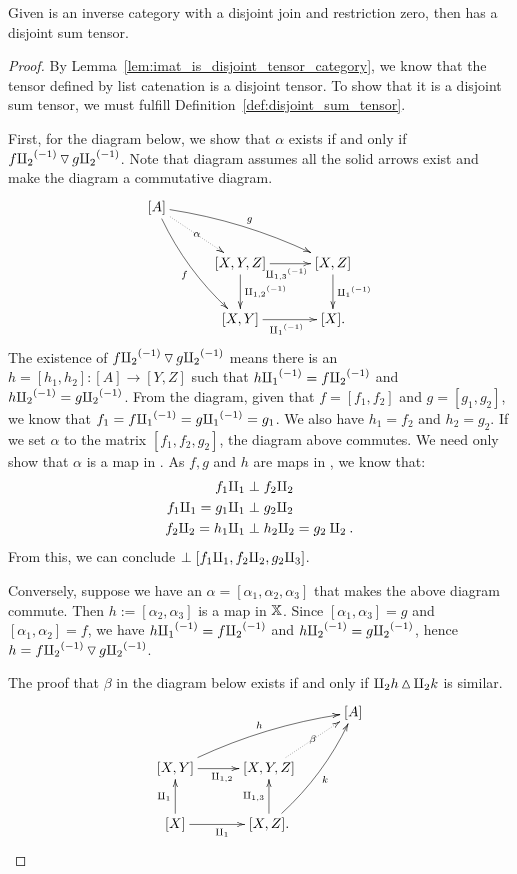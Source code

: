 \begin{lemma}\label{lem:imat_tensor_is_a_disjoint_sum_tensor}
  Given \X is an inverse category with a disjoint join and restriction zero, then \imatx
  has a disjoint sum tensor.
\end{lemma}
\begin{proof}
  By Lemma~\ref{lem:imat_is_disjoint_tensor_category}, we know that the tensor defined by
  list catenation is a disjoint tensor. To show that it is a disjoint sum tensor, we must
  fulfill Definition~\ref{def:disjoint_sum_tensor}.

  First, for the diagram below, we show that $\alpha$ exists if and only if
  $f{\amalg_{2}}^{(-1)} \operatorname{\triangledown} g{\amalg_{2}}^{(-1)}$. Note that diagram assumes all the solid arrows exist and make the
  diagram a commutative diagram.
  \begin{align*}
    \xymatrix@C+5pt{
      [A] \ar@/_/[ddr]_f \ar@/^/[drr]^g \ar@{.>}[dr]|-{\alpha} \\
        & [X,Y,Z] \ar[d]^{\icp{1,2}} \ar[r]_{\icp{1,3}} & [X,Z] \ar[d]^{\icpa} \\
        & [X,Y] \ar[r]_{\icpa} & [X].
    }
  \end{align*}
  The existence of $f{\amalg_{2}}^{(-1)} \operatorname{\triangledown} g{\amalg_{2}}^{(-1)}$ means there is an $h = [h_1,h_2]: [A]\to[Y,Z]$ such that
  $h{\amalg_{1}}^{(-1)} = f{\amalg_{2}}^{(-1)}$ and $h{\amalg_{2}}^{(-1)} = g{\amalg_{2}}^{(-1)}$. From the diagram, given that $f = [f_1,f_2]$ and
  $g = [g_1,g_2]$, we know that $f_1 = f{\amalg_{1}}^{(-1)} = g{\amalg_{1}}^{(-1)} = g_1$. We also have $h_1 = f_2$ and
  $h_2 = g_2$. If we set $\alpha$ to the matrix $[f_1,f_2,g_2]$, the diagram above commutes.
  We need only show that $\alpha$ is a map in \imatx. As $f, g$ and $h$ are maps in
  \imatx, we know that:
  \begin{align*}
    f_1\amalg_{1} & \perp f_2 \amalg_{2}\\
    f_1\amalg_{1} = g_1\amalg_{1} & \perp g_2 \amalg_{2}\\
    f_2 \amalg_{2} = h_1\amalg_{1} & \perp h_2 \amalg_{2} = g_2 \amalg_{2}.\\
  \end{align*}
  From this, we can conclude $\perp [f_1 \amalg_{1}, f_2 \amalg_{2}, g_2 \amalg_{3}]$.

  Conversely, suppose we have an $\alpha = [\alpha_1, \alpha_2, \alpha_3]$ that makes the
  above diagram commute. Then  $h := [\alpha_2, \alpha_3]$ is a map in $\mathbb{X}$.
  Since $[\alpha_1,\alpha_3] = g$ and $[\alpha_1,\alpha_2] = f$, we have
  $h{\amalg_{1}}^{(-1)} = f{\amalg_{2}}^{(-1)}$ and $h{\amalg_{2}}^{(-1)} = g{\amalg_{2}}^{(-1)}$, hence $h = f{\amalg_{2}}^{(-1)} \operatorname{\triangledown} g{\amalg_{2}}^{(-1)}$.

  The proof that $\beta$ in the diagram below exists if and only if $\amalg_{2}h\operatorname{\vartriangle} \amalg_{2}k$
  is similar.
  \[
    \xymatrix@C+5pt{
        &&[A] \\
         [X,Y] \ar[r]_{\cp{1,2}} \ar@/^/[urr]^h &[X,Y,Z] \ar@{.>}[ur]|-{\beta} \\
         [X] \ar[u]^{\cpa} \ar[r]_{\cpa} & [X,Z]. \ar[u]^{\cp{1,3}} \ar@/_/[uur]_k
    }
  \]
\end{proof}

